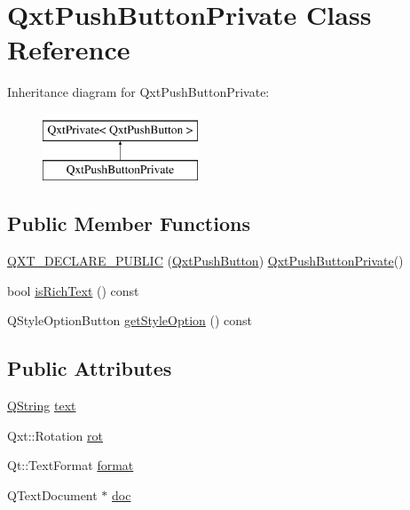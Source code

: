 \hypertarget{class_qxt_push_button_private}{\section{Qxt\-Push\-Button\-Private Class Reference}
\label{class_qxt_push_button_private}
}
Inheritance diagram for Qxt\-Push\-Button\-Private\-:\begin{figure}[H]
\begin{center}
\leavevmode
\includegraphics[height=2.000000cm]{class_qxt_push_button_private}
\end{center}
\end{figure}
\subsection*{Public Member Functions}
\begin{DoxyCompactItemize}
\item 
\hyperlink{class_qxt_push_button_private_a5f79ab12aa19fcd5555a6fbdf2b72a70}{Q\-X\-T\-\_\-\-D\-E\-C\-L\-A\-R\-E\-\_\-\-P\-U\-B\-L\-I\-C} (\hyperlink{class_qxt_push_button}{Qxt\-Push\-Button}) \hyperlink{class_qxt_push_button_private}{Qxt\-Push\-Button\-Private}()
\item 
bool \hyperlink{class_qxt_push_button_private_a5b05f3badf173ca2e49f706a8aed6d6e}{is\-Rich\-Text} () const 
\item 
Q\-Style\-Option\-Button \hyperlink{class_qxt_push_button_private_a8e3bb338aa6da8d5777d52f6fcb34822}{get\-Style\-Option} () const 
\end{DoxyCompactItemize}
\subsection*{Public Attributes}
\begin{DoxyCompactItemize}
\item 
\hyperlink{group___u_a_v_objects_plugin_gab9d252f49c333c94a72f97ce3105a32d}{Q\-String} \hyperlink{class_qxt_push_button_private_ad54b38931509049687f9ae090b8679ba}{text}
\item 
Qxt\-::\-Rotation \hyperlink{class_qxt_push_button_private_a374b849ddf2502372e0445f131fda0c9}{rot}
\item 
Qt\-::\-Text\-Format \hyperlink{class_qxt_push_button_private_abe4f1bcc42efd843befb88a03aaec37b}{format}
\item 
Q\-Text\-Document $\ast$ \hyperlink{class_qxt_push_button_private_aa4c6d2bec2e8694801f2ee10de1c076c}{doc}
\end{DoxyCompactItemize}
